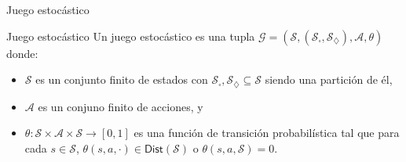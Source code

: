 \documentclass{beamer}
\newcommand{\St}{\mathcal{S}}
\newcommand{\Act}{\mathcal{A}}
\newcommand{\diam}{\diamondsuit}
\newcommand{\cuad}{\square}
\newcommand{\G}{\mathcal{G}}
\newcommand{\dist}{\textsf{Dist}}
\begin{document}
\begin{frame}{Juego estoc\'astico}
	\pause
	\begin{block}{Juego estoc\'astico}
		Un juego estoc\'astico es una tupla $\G = (\St, (\St_\cuad, \St_\diam), \Act, \theta)$ donde:
		\begin{itemize}
			\item $\St$ es un conjunto finito de estados con $\St_\cuad, \St_\diam \subseteq \St$ siendo una partici\'on de \'el,
			\item $\Act$ es un conjuno finito de acciones, y
			\item $\theta : \St \times \Act \times \St \rightarrow [0,1]$ es una funci\'on de transici\'on probabil\'istica tal que para cada $s \in \St$, $\theta(s, a, \cdot) \in \dist(\St)$ o  $\theta(s, a, \St) = 0$.
		\end{itemize}
	\end{block}
\end{frame}
\end{document}
